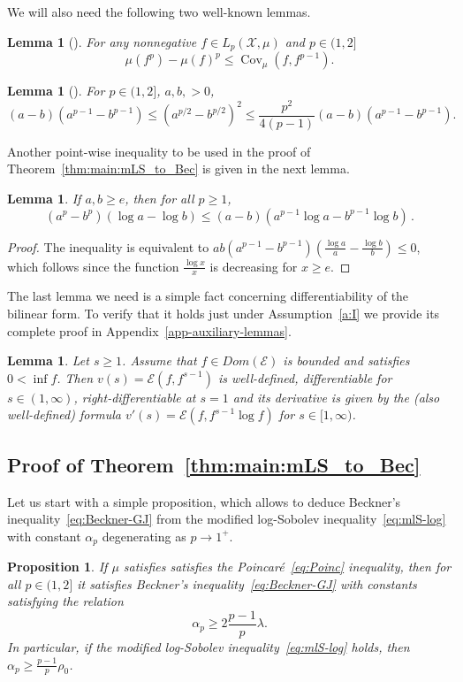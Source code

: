 \documentclass[a4paper]{amsart}
\newtheorem{lemma}[theorem]{Lemma}
\newtheorem{proposition}[theorem]{Proposition} %
\theoremstyle{definition}
\theoremstyle{remark}
\numberwithin{equation}{section}
\newcommand{\calX}{\mathcal{X}}
\newcommand*{\calE}{\mathcal{E}}
\DeclareMathOperator{\Cov}{Cov}	%
\begin{document}
We will also need the following two well-known lemmas.
\begin{lemma}[{\cite[Lemma 14.4]{MR3185193}}]\label{L:BLM-entropic-inequality}
	For any nonnegative $f\in L_p(\calX,\mu)$ and $p\in (1,2]$
 \[
		\mu (f^p) - \mu(f)^p \le \Cov_\mu(f,f^{p-1}).
 \]
\end{lemma}

\begin{lemma}[{\cite[Lemma 2.6]{MR1410112}}]\label{L:ab-inequality}
 For $p\in(1,2]$, $a,b,>0$,
 \[
  (a-b)(a^{p-1}-b^{p-1}) \leq (a^{p/2}-b^{p/2})^2 \leq \frac{p^2}{4(p-1)} (a-b)(a^{p-1}-b^{p-1}).
 \]
\end{lemma}

Another point-wise inequality to be used in the proof of Theorem~\ref{thm:main:mLS_to_Bec} is given in the next lemma.

\begin{lemma}
\label{L:u'v'comp}
	If $a,b\ge e$, then for all $p\ge 1$,
	\[
		(a^p-b^p)(\log a - \log b) \le (a-b)(a^{p-1}\log a-b^{p-1}\log b)\,.
	\]
\end{lemma}
\begin{proof}
	The inequality is equivalent to $ab(a^{p-1}-b^{p-1})(\frac{\log a}{a}- \frac{\log b}{b})\le 0$, which follows since the function
	$\frac{\log x}{x}$ is decreasing for $x\ge e$.
\end{proof}

The last lemma we need  is a simple fact concerning differentiability of the bilinear form. To verify that it holds just under Assumption~\ref{a:I} we provide its complete proof in Appendix~\ref{app-auxiliary-lemmas}.

\begin{lemma}\label{L:v'formula}
	Let $s \ge 1$.
	Assume that $f\in Dom(\calE)$ is bounded and satisfies $0<\inf f$.
	Then $v(s) = \calE(f,f^{s-1})$ is well-defined, differentiable for $s\in(1,\infty)$, right-differentiable at $s=1$ and its derivative is given by the (also well-defined) formula $v'(s) = \calE(f,f^{s-1}\log f)$ for $s\in[1,\infty)$.
\end{lemma}

\subsection{Proof of Theorem~\ref{thm:main:mLS_to_Bec}}

Let us start with a simple proposition, which allows to deduce Beckner's inequality~\eqref{eq:Beckner-GJ} from the modified log-Sobolev inequality~\eqref{eq:mlS-log} with constant $\alpha_p$ degenerating as $p\to 1^+$.
\begin{proposition}
\label{prop:Poinc-to-Bec}
If $\mu$ satisfies satisfies the Poincar\'{e}~\eqref{eq:Poinc} inequality, then for all $p\in(1,2]$ it satisfies Beckner's inequality~\eqref{eq:Beckner-GJ} with constants satisfying the relation
 \[
 	\alpha_p \ge 2\frac{p-1}{p}\lambda.
 \]
 In particular, if the modified log-Sobolev inequality~\eqref{eq:mlS-log} holds, then $\alpha_p \ge \frac{p-1}{p}\rho_0$.
\end{proposition}
\end{document}
